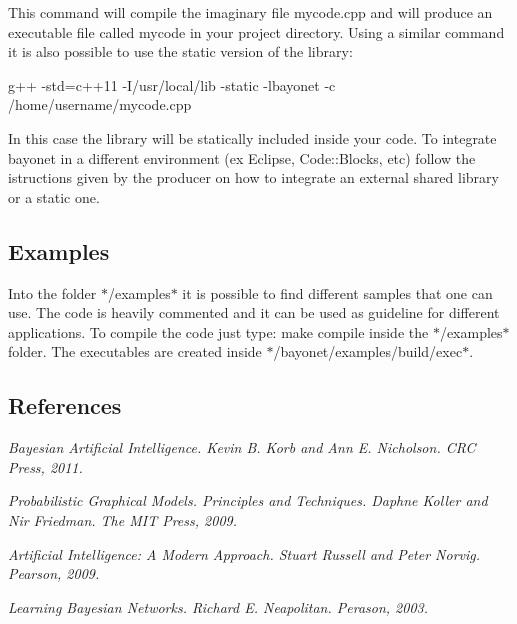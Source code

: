This command will compile the imaginary file mycode.\-cpp and will produce an executable file called mycode in your project directory. Using a similar command it is also possible to use the static version of the library\-:

{\ttfamily g++ -\/std=c++11 -\/\-I/usr/local/lib -\/static -\/lbayonet -\/c /home/username/mycode.cpp}

In this case the library will be statically included inside your code. To integrate bayonet in a different environment (ex Eclipse, Code\-::\-Blocks, etc) follow the istructions given by the producer on how to integrate an external shared library or a static one.

\subsection*{Examples }

Into the folder $\ast$/examples$\ast$ it is possible to find different samples that one can use. The code is heavily commented and it can be used as guideline for different applications. To compile the code just type\-: {\ttfamily make compile} inside the $\ast$/examples$\ast$ folder. The executables are created inside $\ast$/bayonet/examples/build/exec$\ast$.

\subsection*{References }


\begin{DoxyItemize}
\item {\itshape Bayesian Artificial Intelligence. Kevin B. Korb and Ann E. Nicholson. C\-R\-C Press, 2011.}
\item {\itshape Probabilistic Graphical Models. Principles and Techniques. Daphne Koller and Nir Friedman. The M\-I\-T Press, 2009.}
\item {\itshape Artificial Intelligence\-: A Modern Approach. Stuart Russell and Peter Norvig. Pearson, 2009.}
\item {\itshape Learning Bayesian Networks. Richard E. Neapolitan. Perason, 2003.} 
\end{DoxyItemize}